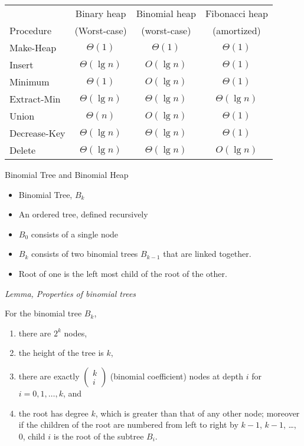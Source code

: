 \documentclass{beamer}
\begin{document}
\begin{frame}{}
\begin{table} 
\begin{tabular}{lccc}
			&Binary heap	&Binomial heap & Fibonacci heap \\
Procedure        	&   (Worst-case) 	&   (worst-case) 	&  (amortized)\\
\hline
 {\sc Make-Heap }	& $\Theta(1)$                 	& $\Theta(1)$                   	& $\Theta(1)$ \\
{\sc Insert}     	& $\Theta(\lg n)$ 			& $O(\lg n)$ 				& $\Theta(1)$ \\
{\sc Minimum} 	& $\Theta(1)$ 				& $O(\lg n)$ 		 		& $\Theta(1)$  \\
{\sc Extract-Min} & $\Theta(\lg n)$				& $\Theta(\lg n)$ 	 		& $\Theta(\lg n)$ \\
{\sc Union} 	& $\Theta(n)$ 				& $O(\lg n)$ 	 			& $\Theta(1)$  \\
{\sc Decrease-Key} & $\Theta(\lg n)$ 			& $\Theta(\lg n)$  			& $\Theta(1)$  \\
{\sc Delete} 	& $\Theta(\lg n)$ 			& $\Theta(\lg n)$ 			& $O(\lg n)$  \\
\end{tabular}
\end{table}
\end{frame}

\begin{frame}{}
\centerline{\large Binomial Tree and Binomial Heap}
\begin{itemize}
\item {Binomial Tree, $B_k$}
\item An ordered tree, defined recursively
\item $B_0$ consists of a single node
\item $B_k$ consists of two binomial trees $B_{k-1}$ that are linked together.
\item Root of one is the left most child of the root of the other. 
\end{itemize}
\end{frame}

\begin{frame}{}
\centerline{\large \it Lemma, Properties of binomial trees}
\vspace{0.5cm}
For the binomial tree $B_k$,
\begin{enumerate}
\item there are $2^k$ nodes,
\item the height of the tree is $k$,
\item there are exactly $\left (  \begin{array}{c} k \\ i  \end{array}\right )$ (binomial coefficient) nodes at depth $i$
 for $i=0, 1, \ldots, k$, and 
\item the root has degree $k$, which is greater than that of any other node; moreover if the
children of the root are numbered from left to right by $k-1$, $k-1$, \ldots, 0, child $i$
is the root of the subtree $B_i$.
\end{enumerate}
\end{frame}
\end{document}
